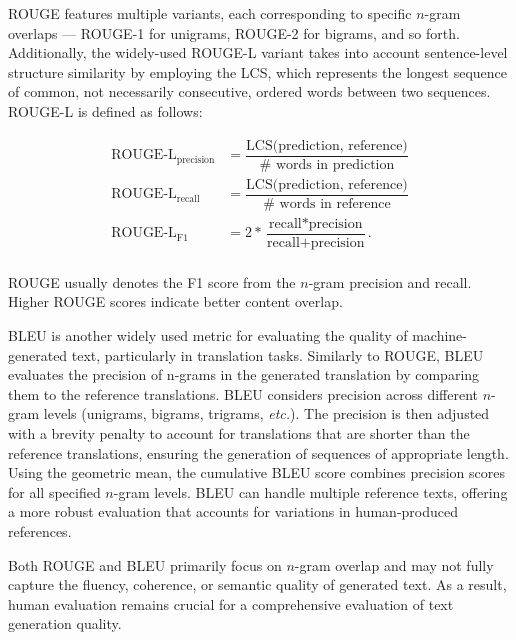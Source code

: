 
\noindent \ac{ROUGE} features multiple variants, each corresponding to specific $n$-gram overlaps — \ac{ROUGE}-1 for unigrams, \ac{ROUGE}-2 for bigrams, and so forth. Additionally, the widely-used ROUGE-L variant takes into account sentence-level structure similarity by employing the \ac{LCS}, which represents the longest sequence of common, not necessarily consecutive, ordered words between two sequences. \ac{ROUGE}-L is defined as follows:

\begin{equation}
    \begin{aligned}
        \text{ROUGE-L}_{\text{precision}} &= \dfrac{\text{LCS(prediction, reference)}}{\# \text{ words in prediction}} \\
        \text{ROUGE-L}_{\text{recall}} &= \dfrac{\text{LCS(prediction, reference)}}{\# \text{ words in reference}} \\
        \text{ROUGE-L}_{\text{F1}} &= 2 * \dfrac{\text{recall} * \text{precision}}{\text{recall} + \text{precision}}. \\
\end{aligned}
\end{equation}
    
\noindent ROUGE usually denotes the F1 score from the $n$-gram precision and recall. Higher ROUGE scores indicate better content overlap. 

\ac{BLEU} is another widely used metric for evaluating the quality of machine-generated text, particularly in translation tasks. Similarly to \ac{ROUGE}, \ac{BLEU} evaluates the precision of n-grams in the generated translation by comparing them to the reference translations. \ac{BLEU} considers precision across different $n$-gram levels (unigrams, bigrams, trigrams, \textit{etc.}). The precision is then adjusted with a brevity penalty to account for translations that are shorter than the reference translations, ensuring the generation of sequences of appropriate length. Using the geometric mean, the cumulative \ac{BLEU} score combines precision scores for all specified $n$-gram levels. \ac{BLEU} can handle multiple reference texts, offering a more robust evaluation that accounts for variations in human-produced references.

Both \ac{ROUGE} and \ac{BLEU} primarily focus on $n$-gram overlap and may not fully capture the fluency, coherence, or semantic quality of generated text. As a result, human evaluation remains crucial for a comprehensive evaluation of text generation quality.

